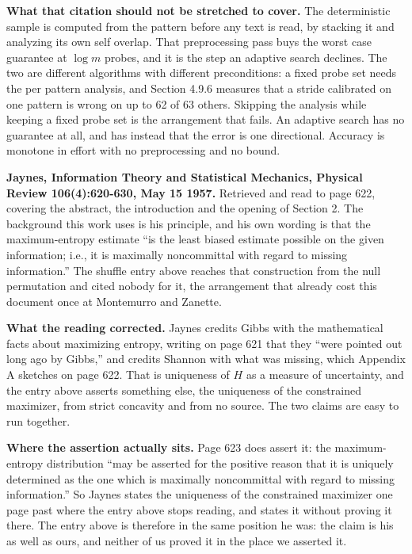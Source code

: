 \textbf{What that citation should not be stretched to cover.} The deterministic sample is computed from the pattern before any text is read, by stacking it and analyzing its own self overlap. That preprocessing pass buys the worst case guarantee at \(\log m\) probes, and it is the step an adaptive search declines. The two are different algorithms with different preconditions: a fixed probe set needs the per pattern analysis, and Section 4.9.6 measures that a stride calibrated on one pattern is wrong on up to 62 of 63 others. Skipping the analysis while keeping a fixed probe set is the arrangement that fails. An adaptive search has no guarantee at all, and has instead that the error is one directional. Accuracy is monotone in effort with no preprocessing and no bound.

\textbf{Jaynes, Information Theory and Statistical Mechanics, Physical Review 106(4):620-630, May 15 1957.} Retrieved and read to page 622, covering the abstract, the introduction and the opening of Section 2. The background this work uses is his principle, and his own wording is that the maximum-entropy estimate
``is the least biased estimate possible on the given information; i.e., it is maximally noncommittal with regard to missing information.''
The shuffle entry above reaches that construction from the null permutation and cited nobody for it, the arrangement that already cost this document once at Montemurro and Zanette.

\textbf{What the reading corrected.} Jaynes credits Gibbs with the mathematical facts about maximizing entropy, writing on page 621 that they ``were pointed out long ago by Gibbs,'' and credits Shannon with what was missing, which Appendix A sketches on page 622. That is uniqueness of \(H\) as a measure of uncertainty, and the entry above asserts something else, the uniqueness of the constrained maximizer, from strict concavity and from no source. The two claims are easy to run together.

\textbf{Where the assertion actually sits.} Page 623 does assert it: the maximum-entropy distribution
``may be asserted for the positive reason that it is uniquely determined as the one which is maximally noncommittal with regard to missing information.''
So Jaynes states the uniqueness of the constrained maximizer one page past where the entry above stops reading, and states it without proving it there. The entry above is therefore in the same position he was: the claim is his as well as ours, and neither of us proved it in the place we asserted it.

